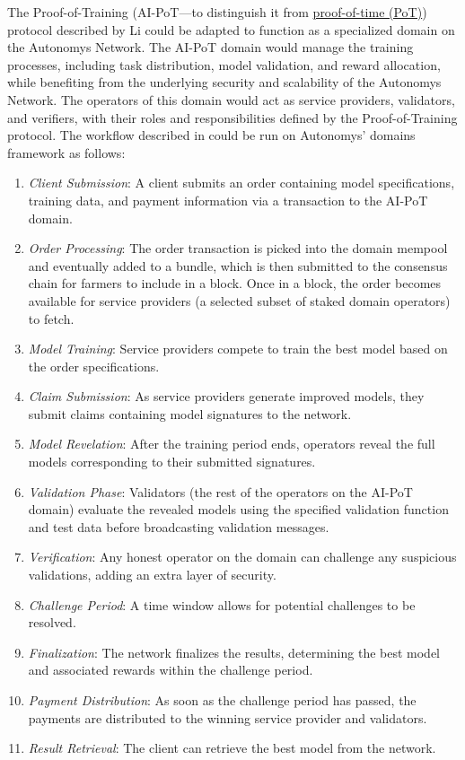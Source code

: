 \documentclass[conference]{IEEEtran}
\begin{document}
The Proof-of-Training (AI-PoT—to distinguish it from \hyperref[sec:pot]{proof-of-time (PoT)}) protocol described by Li\cite{li2023} could be adapted to function as a specialized domain on the Autonomys Network. The AI-PoT domain would manage the training processes, including task distribution, model validation, and reward allocation, while benefiting from the underlying security and scalability of the Autonomys Network. The operators of this domain would act as service providers, validators, and verifiers, with their roles and responsibilities defined by the Proof-of-Training protocol. The workflow described in \cite{li2023} could be run on Autonomys' domains framework as follows:
\begin{enumerate}
    \item \textit{Client Submission}: A client submits an order containing model specifications, training data, and payment information via a transaction to the AI-PoT domain.
    \item \textit{Order Processing}: The order transaction is picked into the domain mempool and eventually added to a bundle, which is then submitted to the consensus chain for farmers to include in a block. Once in a block, the order becomes available for service providers (a selected subset of staked domain operators) to fetch.
    \item \textit{Model Training}: Service providers compete to train the best model based on the order specifications.
    \item \textit{Claim Submission}: As service providers generate improved models, they submit claims containing model signatures to the network.
    \item \textit{Model Revelation}: After the training period ends, operators reveal the full models corresponding to their submitted signatures.
    \item \textit{Validation Phase}: Validators (the rest of the operators on the AI-PoT domain) evaluate the revealed models using the specified validation function and test data before broadcasting validation messages.
    \item \textit{Verification}: Any honest operator on the domain can challenge any suspicious validations, adding an extra layer of security.
    \item \textit{Challenge Period}: A time window allows for potential challenges to be resolved.
    \item \textit{Finalization}: The network finalizes the results, determining the best model and associated rewards within the challenge period.
    \item \textit{Payment Distribution}: As soon as the challenge period has passed, the payments are distributed to the winning service provider and validators.
    \item \textit{Result Retrieval}: The client can retrieve the best model from the network.
\end{enumerate}
\end{document}
